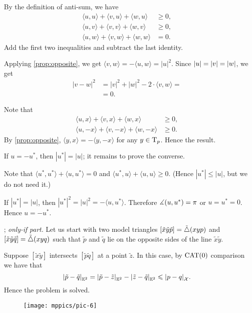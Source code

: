 By the definition of anti-sum, we have
\begin{align*}
\langle u,u\rangle +\langle v,u\rangle +\langle w,u\rangle &\ge 0,
\\
\langle u,v\rangle +\langle v,v\rangle +\langle w,v\rangle &\ge 0,
\\
\langle u,w\rangle +\langle v,w\rangle +\langle w,w\rangle &= 0.
\end{align*}
Add the first two inequalities and subtract the last identity.

Applying \ref{prop:opposite}, we get $\langle v,w\rangle=-\langle u,w\rangle=|u|^2$.
Since $|u|\z=|v|\z=|w|$, we get
\begin{align*}
|v-w|^2&=|v|^2+|w|^2-2\cdot \langle v,w\rangle=
\\
&=0.
\end{align*}


Note that 
\begin{align*}
\langle u,x\rangle +\langle v,x\rangle +\langle w,x\rangle &\ge 0,
\\
\langle u,-x\rangle +\langle v,-x\rangle +\langle w,-x\rangle &\ge 0.
\end{align*}
By \ref{prop:opposite}, $\langle y,x\rangle=-\langle y ,-x\rangle$ for any $y\in \mathrm{T}_p$.
Hence the result.


If $u=-u^*$, then $|u^*|= |u|$; it remains to prove the converse.

Note that $\langle u^*,u^*\rangle +\langle u,u^*\rangle = 0$
and $\langle u^*,u\rangle +\langle u,u\rangle \ge 0$.
(Hence $|u^*|\le |u|$, but we do not need it.)

If $|u^*|= |u|$, then $|u^*|^2=|u|^2=-\langle u,u^*\rangle$.
Therefore $\measuredangle(u,u^*)=\pi$ or $u=u^*=0$.
Hence $u=-u^*$.

\parbf{\ref{ex:sba-2+2-short}}; \textit{only-if part.}
Let us start with two model triangles $[\tilde x\tilde y\tilde p]=\tilde\triangle(xyp)$ and $[\tilde x\tilde y\tilde q]=\tilde\triangle(xyq)$ such that $\tilde p$ and $\tilde q$ lie on the opposite sides of the line $\tilde x\tilde y$.

Suppose $[\tilde x \tilde y]$ intersects $[\tilde p\tilde q]$ at a point $\tilde z$.
In this case, by $\mathrm{CAT}(0)$ comparison we have that
\[\dist{\tilde p}{\tilde q}{\EE^2}=\dist{\tilde p}{\tilde z}{\EE^2}-\dist{\tilde z}{\tilde q}{\EE^2}\le \dist{p}{q}{\spc{X}}.\]
Hence the problem is solved.

\begin{wrapfigure}{r}{30mm}
\vskip-2mm
\centering
\texttt{[image: mppics/pic-6]}
\end{wrapfigure}

